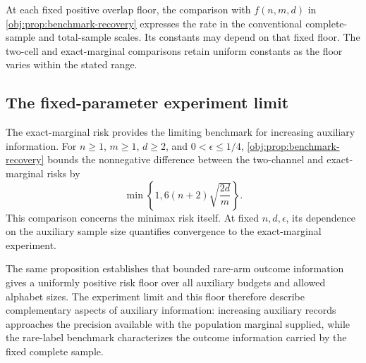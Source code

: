 At each fixed positive overlap floor, the comparison with \(f(n,m,d)\) in \cref{obj:prop:benchmark-recovery} expresses the rate in the conventional complete-sample and total-sample scales. Its constants may depend on that fixed floor. The two-cell and exact-marginal comparisons retain uniform constants as the floor varies within the stated range.

\subsection{The fixed-parameter experiment limit}

The exact-marginal risk provides the limiting benchmark for increasing auxiliary information. For \(n\ge1\), \(m\ge1\), \(d\ge2\), and \(0<\epsilon\le1/4\), \cref{obj:prop:benchmark-recovery} bounds the nonnegative difference between the two-channel and exact-marginal risks by
\[
\min\left\{1,6(n+2)\sqrt{\frac{2d}{m}}\right\}.
\]
This comparison concerns the minimax risk itself. At fixed \(n,d,\epsilon\), its dependence on the auxiliary sample size quantifies convergence to the exact-marginal experiment.

The same proposition establishes that bounded rare-arm outcome information gives a uniformly positive risk floor over all auxiliary budgets and allowed alphabet sizes. The experiment limit and this floor therefore describe complementary aspects of auxiliary information: increasing auxiliary records approaches the precision available with the population marginal supplied, while the rare-label benchmark characterizes the outcome information carried by the fixed complete sample.
